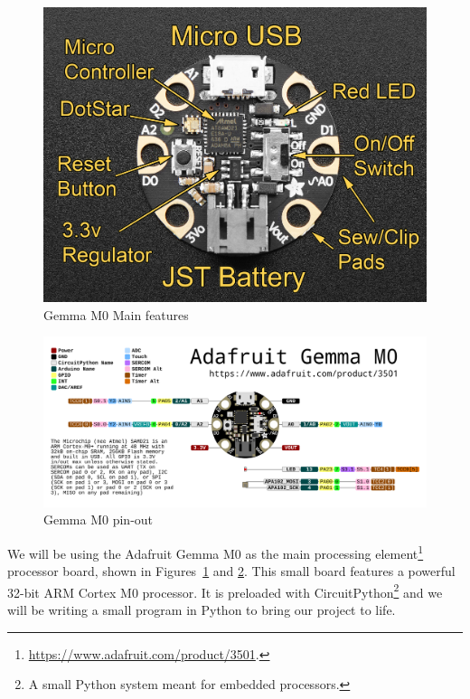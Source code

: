 \documentclass[letterpaper,twoside,12pt]{article}
\begin{document}
\begin{figure}[hbpt]\begin{centering}%
\includegraphics[width=5in]{gemma_guide.jpg}
\caption{Gemma M0 Main features}
\label{fig:gemmaguide}
\end{centering}\end{figure}
\begin{figure}[hbpt]\begin{centering}%
\includegraphics[width=5in]{adafruit_gemma_Adafruit_GEMMA_M0_pinout.png}
\caption{Gemma M0 pin-out}
\label{fig:gemmapinout}
\end{centering}\end{figure}
We will be using the Adafruit Gemma M0 as the main processing element\footnote{
\url{https://www.adafruit.com/product/3501}.} processor board, shown in
Figures~\ref{fig:gemmaguide} and \ref{fig:gemmapinout}. This small board
features a powerful 32-bit ARM Cortex M0 processor. It is preloaded with
CircuitPython\footnote{A small Python system meant for embedded processors.} 
and we will be writing a small program in Python to bring our project to life.
\clearpage
\end{document}
